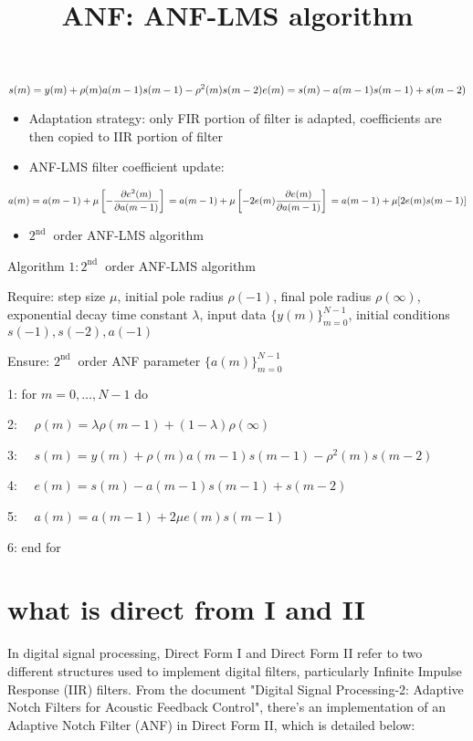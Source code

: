 \title{ANF: ANF-LMS algorithm }


\begin{equation}
 s(m)=y(m)+\rho(m) a(m-1) s(m-1)-\rho^{2}(m) s(m-2) \\
 e(m)=s(m)-a(m-1) s(m-1)+s(m-2)
\end{equation}

\begin{itemize}
  \item Adaptation strategy: only FIR portion of filter is adapted, coefficients are then copied to IIR portion of filter
  \item ANF-LMS filter coefficient update:
\end{itemize}

\begin{equation}
a(m) = a(m-1)+\mu\left[-\frac{\partial e^{2}(m)}{\partial a(m-1)}\right] \\
 =a(m-1)+\mu\left[-2 e(m) \frac{\partial e(m)}{\partial a(m-1)}\right] \\ =a(m-1)+\mu[2 e(m) s(m-1)]
\end{equation}


\begin{itemize}
  \item $2^{\text {nd }}$ order ANF-LMS algorithm
\end{itemize}

Algorithm $1: 2^{\text {nd }}$ order ANF-LMS algorithm

Require: step size $\mu$, initial pole radius $\rho(-1)$, final pole radius $\rho(\infty)$, exponential decay time constant $\lambda$, input data $\{y(m)\}_{m=0}^{N-1}$, initial conditions $s(-1), s(-2), a(-1)$

Ensure: $2^{\text {nd }}$ order ANF parameter $\{a(m)\}_{m=0}^{N-1}$

1: for $m=0, \ldots, N-1$ do

2: $\quad \rho(m)=\lambda \rho(m-1)+(1-\lambda) \rho(\infty)$

3: $\quad s(m)=y(m)+\rho(m) a(m-1) s(m-1)-\rho^{2}(m) s(m-2)$

4: $\quad e(m)=s(m)-a(m-1) s(m-1)+s(m-2)$

5: $\quad a(m)=a(m-1)+2 \mu e(m) s(m-1)$

6: end for

\section{what is direct from I and II}

In digital signal processing, Direct Form I and Direct Form II refer to two different structures used to implement digital filters, particularly Infinite Impulse Response (IIR) filters. From the document "Digital Signal Processing-2: Adaptive Notch Filters for Acoustic Feedback Control", there's an implementation of an Adaptive Notch Filter (ANF) in Direct Form II, which is detailed below:

